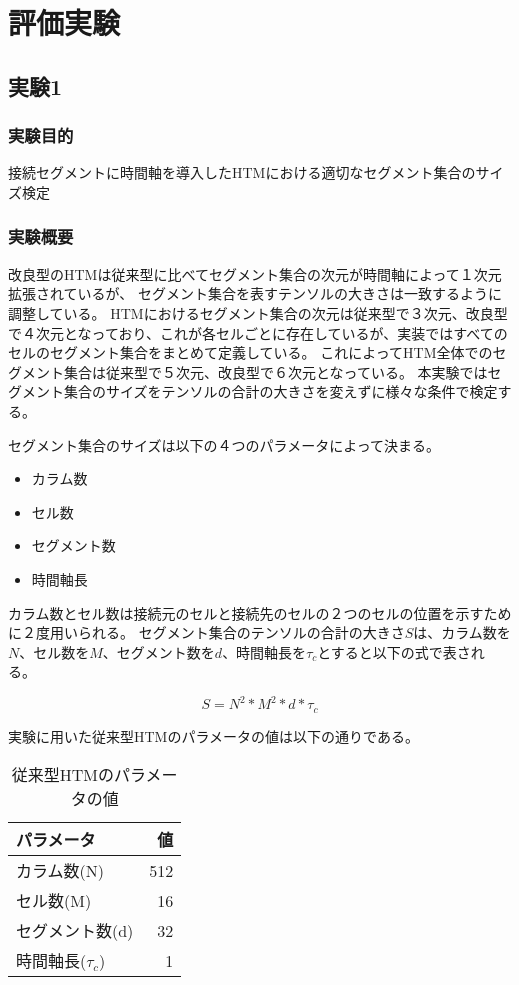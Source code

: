 \chapter{評価実験}

\section{実験1}
\subsection{実験目的}
接続セグメントに時間軸を導入したHTMにおける適切なセグメント集合のサイズ検定

\subsection{実験概要}
改良型のHTMは従来型に比べてセグメント集合の次元が時間軸によって１次元拡張されているが、
セグメント集合を表すテンソルの大きさは一致するように調整している。
HTMにおけるセグメント集合の次元は従来型で３次元、改良型で４次元となっており、これが各セルごとに存在しているが、実装ではすべてのセルのセグメント集合をまとめて定義している。
これによってHTM全体でのセグメント集合は従来型で５次元、改良型で６次元となっている。
本実験ではセグメント集合のサイズをテンソルの合計の大きさを変えずに様々な条件で検定する。

セグメント集合のサイズは以下の４つのパラメータによって決まる。
\begin{itemize}
  \item カラム数
  \item セル数
  \item セグメント数
  \item 時間軸長
\end{itemize}

カラム数とセル数は接続元のセルと接続先のセルの２つのセルの位置を示すために２度用いられる。
セグメント集合のテンソルの合計の大きさ$S$は、カラム数を$N$、セル数を$M$、セグメント数を$d$、時間軸長を$\tau_c$とすると以下の式で表される。

\begin{equation}
  S = N^2 * M^2 * d * \tau_c
\end{equation}

実験に用いた従来型HTMのパラメータの値は以下の通りである。
\begin{table}[hbtp]
  \caption{従来型HTMのパラメータの値}
  \label{old_htm_parameter}
  \centering
  \begin{tabular}{lr}
    \hline
    パラメータ & 値 \\
    \hline \hline
    カラム数(N) & 512 \\
    セル数(M) & 16 \\
    セグメント数(d) & 32 \\
    時間軸長($\tau_c$) & 1 \\
    \hline
  \end{tabular}
\end{table}

